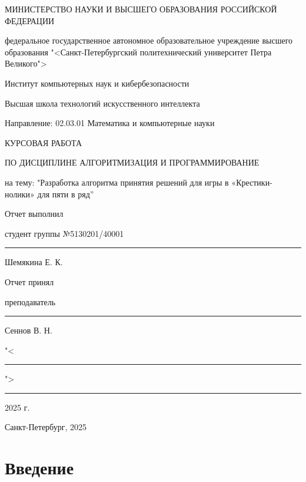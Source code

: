 \documentclass[a4paper]{article}
\begin{document}
\begin{center}
	\thispagestyle{empty}
	\linespread{1.3}
	\MakeUppercase{министерство науки и высшего образования российской федерации}
	
	\normalsize
	федеральное государственное автономное образовательное учреждение высшего образования "<Санкт-Петербургский политехнический университет Петра Великого">
	
	\vspace{0.3cm}Институт компьютерных наук и кибербезопасности
	
	\vspace{0.3cm}Высшая школа технологий искусственного интеллекта
	
	\vspace{0.3cm}Направление: 02.03.01 Математика и компьютерные науки
	
	\vspace{2cm}\large
	КУРСОВАЯ РАБОТА
	
	ПО ДИСЦИПЛИНЕ АЛГОРИТМИЗАЦИЯ И ПРОГРАММИРОВАНИЕ
	
	на тему: "Разработка алгоритма принятия решений для игры в «Крестики-нолики» для пяти в ряд”
	
	\vspace{4cm}
\end{center}

\normalsize
Отчет выполнил

студент группы №5130201/40001 \hfill  \rule{2.7cm}{0.01cm} Шемякина Е. К.

\vspace{1cm}
Отчет принял

преподаватель \hfill  \rule{2.7cm}{0.01cm}  \hspace{0.25cm} Сеннов В. Н.

\vspace{1cm}
\begin{flushright}
	"<\rule{1cm}{0.01cm}"> \rule{3cm}{0.01cm}2025 г.
\end{flushright}

\begin{center}
	\small
	\vspace{2cm}Санкт-Петербург, 2025
\end{center}
\clearpage

\normalsize
\renewcommand{\cftsecleader}{\cftdotfill{\cftdotsep}}
\renewcommand{\cftdotsep}{1}
\tableofcontents
\clearpage


\section*{Введение}
\end{document}
